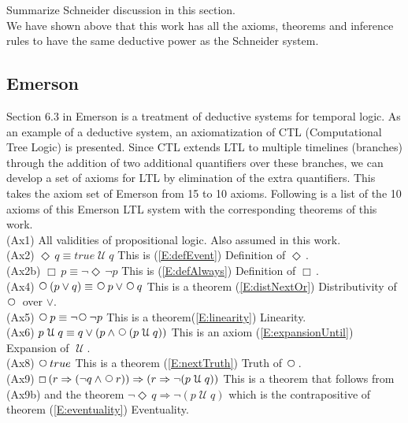 \documentclass[12pt, fleqn, leqno]{article}
\newcommand{\impl}{\ensuremath{\Rightarrow}}        %
\newcommand{\Until}{\;\mathcal{U}\;}
\newcommand{\Next}{\;\,\text{\raisebox{3.5pt}{\circle{6}}}}
\newcommand{\Event}{\Diamond\,}
\newcommand{\Always}{\Box\,}
\begin{document}
Summarize Schneider discussion in this section.\\

We have shown above that this work has all the axioms, 
theorems and inference rules to have the same deductive power as the Schneider system.\\


\subsection{Emerson}

Section 6.3 in Emerson \cite{Emer} is a treatment of deductive systems for temporal logic. As an example
of a deductive system, an axiomatization of CTL (Computational Tree Logic) is presented. Since CTL extends
LTL to multiple timelines (branches) through the addition of two additional quantifiers over these branches, we can
develop a set of axioms for LTL by elimination of the extra quantifiers. This takes the axiom set of Emerson from 15 to 10 axioms.
Following is a list of the 10 axioms of this Emerson LTL system with the corresponding theorems of this work.\\



(Ax1) All validities of propositional logic. Also assumed in this work.\\

(Ax2) $\Event q \equiv true \Until q$ This is (\ref{E:defEvent}) Definition of $\Event$.\\

(Ax2b) $\Always p \equiv \neg \Event \neg p$ This is (\ref{E:defAlways}) Definition of $\Always$.\\

(Ax4) $\Next (p \lor q) \equiv \Next p \lor \Next q$ This is a theorem (\ref{E:distNextOr}) Distributivity of $\Next$ over $\lor$.\\

(Ax5) $\Next p \equiv \neg\Next\neg p$ This is a theorem(\ref{E:linearity}) Linearity.\\

(Ax6) $p \Until q \equiv q \lor (p \land \Next (p \Until q))$ This is an axiom (\ref{E:expansionUntil}) Expansion of $\Until$.\\

(Ax8) $\Next true$ This is a theorem (\ref{E:nextTruth}) Truth of $\Next$.\\

(Ax9) $\Always ( r \impl (\neg q \land \Next r)) \impl (r \impl \neg (p \Until q))$ This is a theorem that follows from (Ax9b) 
and the theorem $\neg \Event q \impl \neg (p \Until q)$ which is the contrapositive of theorem (\ref{E:eventuality}) Eventuality.\\
\end{document}
